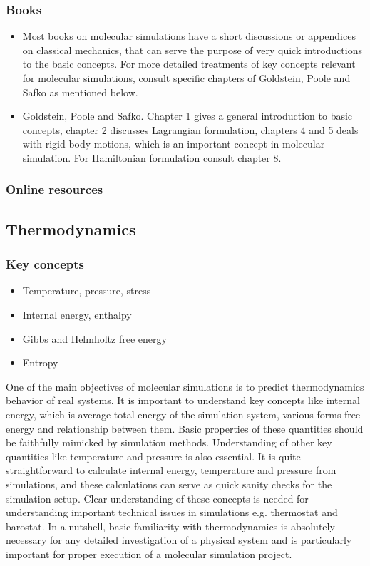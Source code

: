 \documentclass[9pt,bestpractices]{livecoms}
\begin{document}
\subsubsection{Books}
\begin{itemize}
\item Most books on molecular simulations have a short discussions or appendices on classical mechanics, that can serve the purpose of very quick introductions to the basic concepts. For more detailed treatments of key concepts relevant for molecular simulations, consult specific chapters of Goldstein, Poole and Safko as mentioned below.

\item Goldstein, Poole and Safko. Chapter 1 gives a general introduction to basic concepts, chapter 2 discusses Lagrangian formulation, chapters 4 and 5 deals with rigid body motions, which is an important concept in molecular simulation. For Hamiltonian formulation consult chapter 8.
\end{itemize}

\subsubsection{Online resources}


\subsection{Thermodynamics}
\subsubsection{Key concepts}
\begin{itemize}
\item Temperature, pressure, stress
\item Internal energy, enthalpy
\item Gibbs and Helmholtz free energy
\item Entropy
\end{itemize}

One of the main objectives of molecular simulations is to predict thermodynamics
behavior of real systems. It is important to understand key concepts like
internal energy, which is average total energy of the simulation system, various
forms free energy and relationship between them. Basic properties of these
quantities should be faithfully mimicked by simulation methods. Understanding of
other key quantities like temperature and pressure is also essential. It is
quite straightforward to calculate internal energy, temperature and pressure
from simulations, and these calculations can serve as quick sanity checks for
the simulation setup. Clear understanding of these concepts is needed for
understanding important technical issues in simulations e.g. thermostat and
barostat.  In a nutshell, basic familiarity with thermodynamics is absolutely
necessary for any detailed investigation of a physical system and is
particularly important for proper execution of a molecular simulation project.
\end{document}
